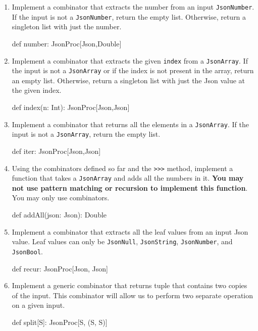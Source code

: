 \begin{enumerate}
    \item Implement a combinator that extracts the number from an input
    \texttt{JsonNumber}. If the input is not a \texttt{JsonNumber}, return the
    empty list. Otherwise, return a singleton list with just the number.
    \begin{scalacode}
    def number: JsonProc[Json,Double]
    \end{scalacode}

    \item Implement a combinator that extracts the given \texttt{index} from
    a \texttt{JsonArray}. If the input is not a \texttt{JsonArray} or if the index
    is not present in the array, return an empty list. Otherwise, return
    a singleton list with just the Json value at the given index.
    \begin{scalacode}
    def index(n: Int): JsonProc[Json,Json]
    \end{scalacode}

    \item Implement a combinator that returns all the elements in a
    \texttt{JsonArray}. If the input is not a \texttt{JsonArray}, return the
    empty list.
    \begin{scalacode}
    def iter: JsonProc[Json,Json]
    \end{scalacode}

    \item Using the combinators defined so far and the \texttt{>>>} method,
    implement a function that takes a \texttt{JsonArray} and adds all the
    numbers in it. \textbf{You may not use pattern matching or recursion to
    implement this function}. You may only use combinators.
    \begin{scalacode}
    def addAll(json: Json): Double
    \end{scalacode}

    \item Implement a combinator that extracts all the leaf values from an
    input Json value. Leaf values can only be \texttt{JsonNull},
    \texttt{JsonString}, \texttt{JsonNumber}, and \texttt{JsonBool}.
    \begin{scalacode}
    def recur: JsonProc[Json, Json]
    \end{scalacode}

    \item Implement a generic combinator that returns tuple that contains
    two copies of the input. This combinator will allow us to perform two
    separate operation on a given input.
    \begin{scalacode}
    def split[S]: JsonProc[S, (S, S)]
    \end{scalacode}


\end{enumerate}
